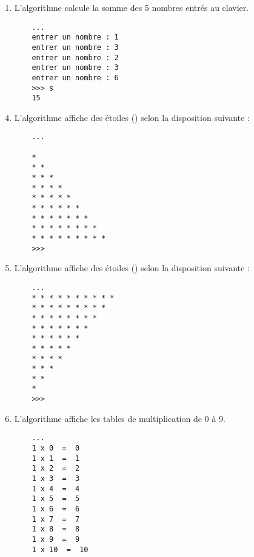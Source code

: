 \begin{description}
\begin{minipage}[t]{7.5cm}
\begin{enumerate}
	\item L'algorithme calcule la somme des 5 nombres entrés au clavier.

	\begin{py}{12cm}
	\begin{verbatim}
	... 
	entrer un nombre : 1
	entrer un nombre : 3
	entrer un nombre : 2
	entrer un nombre : 3
	entrer un nombre : 6
	>>> s
	15
	\end{verbatim}
	\end{py}
	\end{enumerate}
	\end{minipage}
	\hfill
	\begin{minipage}[t]{7.5cm}
	\begin{enumerate}\setcounter{enumi}{3}
	\item L'algorithme affiche des étoiles ({\tt *}) selon la disposition
		suivante :

	\begin{py}{12cm}
	\begin{verbatim}
	... 

	*
	* *
	* * *
	* * * *
	* * * * *
	* * * * * *
	* * * * * * *
	* * * * * * * *
	* * * * * * * * *
	>>> 
	\end{verbatim}
	\end{py}

	\item L'algorithme affiche des étoiles ({\tt *}) selon la disposition
		suivante :

	\begin{py}{12cm}
	\begin{verbatim}
	... 
	* * * * * * * * * *
	* * * * * * * * *
	* * * * * * * *
	* * * * * * *
	* * * * * *
	* * * * *
	* * * *
	* * *
	* *
	*
	>>> 
	\end{verbatim}
	\end{py}
	\end{enumerate}
	\end{minipage}

	\begin{minipage}[t]{7.5cm}
	\begin{enumerate}\setcounter{enumi}{5}
	
	\item L'algorithme affiche les tables de multiplication de 0 à 9.

	\begin{py}{12cm}
	\begin{verbatim}
	... 
	1 x 0  =  0
	1 x 1  =  1
	1 x 2  =  2
	1 x 3  =  3
	1 x 4  =  4
	1 x 5  =  5
	1 x 6  =  6
	1 x 7  =  7
	1 x 8  =  8
	1 x 9  =  9
	1 x 10  =  10


\end{verbatim}
\end{py}
\end{enumerate}
\end{minipage}
\end{description}
